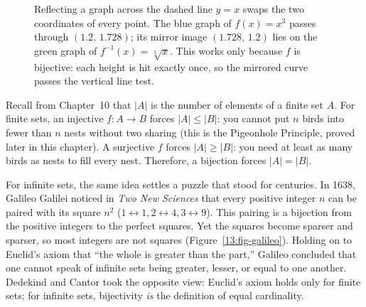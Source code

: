 \begin{figure}[htbp]
\centering
{}
\caption{Reflecting a graph across the dashed line $y = x$ swaps the two coordinates of every point. The blue graph of $f(x) = x^3$ passes through $(1.2,\, 1.728)$; its mirror image $(1.728,\, 1.2)$ lies on the green graph of $f^{-1}(x) = \sqrt[3]{x}$. This works only because $f$ is bijective: each height is hit exactly once, so the mirrored curve passes the vertical line test.}
\label{13:fig-inverse-reflection}
\end{figure}

\begin{intuitionbox}
Recall from Chapter~10 that $|A|$ is the number of elements of a finite set $A$. For finite sets, an injective $f: A \to B$ forces $|A| \le |B|$: you cannot put $n$ birds into fewer than $n$ nests without two sharing (this is the Pigeonhole Principle, proved later in this chapter). A surjective $f$ forces $|A| \ge |B|$: you need at least as many birds as nests to fill every nest. Therefore, a bijection forces $|A| = |B|$.

For infinite sets, the same idea settles a puzzle that stood for centuries. In 1638, Galileo Galilei noticed in \emph{Two New Sciences} that every positive integer $n$ can be paired with its square $n^2$ ($1 \leftrightarrow 1, 2 \leftrightarrow 4, 3 \leftrightarrow 9$). This pairing is a bijection from the positive integers to the perfect squares. Yet the squares become sparser and sparser, so most integers are not squares (Figure~\ref{13:fig-galileo}). Holding on to Euclid's axiom that ``the whole is greater than the part,'' Galileo concluded that one cannot speak of infinite sets being greater, lesser, or equal to one another. Dedekind and Cantor took the opposite view: Euclid's axiom holds only for finite sets; for infinite sets, bijectivity \emph{is} the definition of equal cardinality.
\end{intuitionbox}

